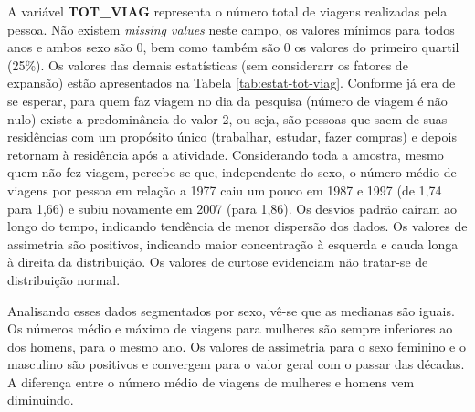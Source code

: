 A variável \textbf{TOT_VIAG} representa o número total de viagens realizadas pela pessoa. Não existem \textit{missing values} neste campo, os valores mínimos para todos anos e ambos sexo são 0, bem como também são 0 os valores do primeiro quartil (25\%). Os valores das demais estatísticas (sem considerarr os fatores de expansão) estão apresentados na Tabela \ref{tab:estat-tot-viag}. Conforme já era de se esperar, para quem faz viagem no dia da pesquisa (número de viagem é não nulo) existe a predominância do valor 2, ou seja, são pessoas que saem de suas residências com um propósito único (trabalhar, estudar, fazer compras) e depois retornam à residência após a atividade.
Considerando toda a amostra, mesmo quem não fez viagem, percebe-se que, independente do sexo, o número médio de viagens por pessoa em relação a 1977 caiu um pouco em 1987 e 1997 (de 1,74 para 1,66) e subiu novamente em 2007 (para 1,86). Os desvios padrão caíram ao longo do tempo, indicando tendência de menor dispersão dos dados. Os valores de assimetria são positivos, indicando maior concentração à esquerda e cauda longa à direita da distribuição. Os valores de curtose evidenciam não tratar-se de distribuição normal.

Analisando esses dados segmentados por sexo, vê-se que as medianas são iguais. Os números médio e máximo de viagens para mulheres são sempre inferiores ao dos homens, para o mesmo ano. Os valores de assimetria para o sexo feminino e o masculino são positivos e convergem para o valor geral com o passar das décadas. 
A diferença entre o número médio de viagens de mulheres e homens vem diminuindo.

